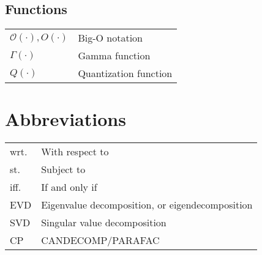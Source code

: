 \documentclass{article}
\begin{document}
\subsection{Functions}
\begin{xltabular}{\textwidth}{XX}
    \(\mathcal{O}(\cdot), O(\cdot)\) & Big-O notation\\
    \(\Gamma(\cdot)\) & Gamma function\\
    \(Q(\cdot)\) & Quantization function
\end{xltabular}

\section{Abbreviations}
\begin{xltabular}{\textwidth}{XX}
    wrt. & With respect to\\
    st. & Subject to\\
    iff. & If and only if\\
    EVD & Eigenvalue decomposition, or eigendecomposition \cite{nossekAdaptiveArraySignal2015}\\
    SVD & Singular value decomposition\\
    CP & CANDECOMP/PARAFAC\\
\end{xltabular}

\printbibliography
\end{document}
